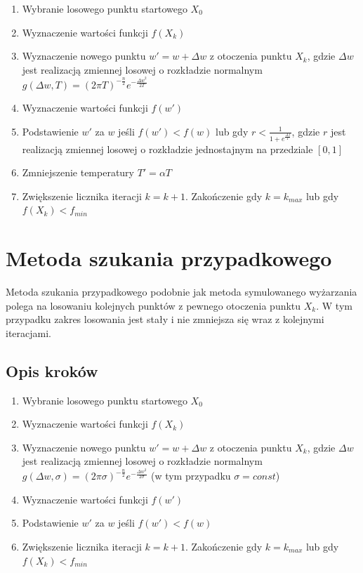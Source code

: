 \documentclass{article}
\begin{document}
\begin{enumerate}
    \item Wybranie losowego punktu startowego $X_0$
    \item Wyznaczenie wartości funkcji $f(X_k)$
    \item Wyznaczenie nowego punktu $w'= w + \Delta w$ z otoczenia punktu $X_k$,
    gdzie $\Delta w$ jest realizacją zmiennej losowej o rozkładzie normalnym
    $g(\Delta w,T) = (2 \pi T) ^{-\frac{n}{2}} e^{-\frac{{\Delta w }^2}{2T}}$
    \item Wyznaczenie wartości funkcji $f(w')$
    \item Podstawienie $w'$ za $w$ jeśli $f(w') < f(w)$ lub gdy
    $r < \frac{1}{1 + e^{\frac{\Delta f}{T}}}$, gdzie $r$ jest realizacją zmiennej
    losowej o rozkładzie jednostajnym na przedziale $[0, 1]$
    \item Zmniejszenie temperatury $T' = \alpha T$
    \item Zwiększenie licznika iteracji $k = k + 1$. Zakończenie gdy $k = k_{max}$ lub gdy $f(X_k) < f_{min}$
\end{enumerate}

\section{Metoda szukania przypadkowego}
Metoda szukania przypadkowego podobnie jak metoda symulowanego
wyżarzania polega na losowaniu kolejnych punktów z pewnego
otoczenia punktu $X_k$. W tym przypadku zakres losowania
jest stały i nie zmniejsza się wraz z kolejnymi iteracjami.

\subsection{Opis kroków}

\begin{enumerate}
    \item Wybranie losowego punktu startowego $X_0$
    \item Wyznaczenie wartości funkcji $f(X_k)$
    \item Wyznaczenie nowego punktu $w'= w + \Delta w$ z otoczenia punktu $X_k$,
    gdzie $\Delta w$ jest realizacją zmiennej losowej o rozkładzie normalnym
    $g(\Delta w,\sigma) = (2 \pi \sigma) ^{-\frac{n}{2}} e^{-\frac{{\Delta w }^2}{2\sigma}}$
    (w tym przypadku $\sigma = const$)
    \item Wyznaczenie wartości funkcji $f(w')$
    \item Podstawienie $w'$ za $w$ jeśli $f(w') < f(w)$ 
    \item Zwiększenie licznika iteracji $k = k + 1$. Zakończenie gdy $k = k_{max}$ lub gdy $f(X_k) < f_{min}$
\end{enumerate}
\end{document}
